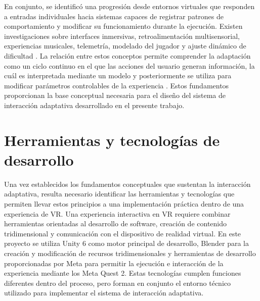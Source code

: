 En conjunto, se identificó una progresión desde entornos virtuales que 
responden a entradas individuales hacia sistemas capaces de registrar 
patrones de comportamiento y modificar su funcionamiento durante la 
ejecución. Existen investigaciones sobre interfaces inmersivas, 
retroalimentación multisensorial, experiencias musicales, telemetría, 
modelado del jugador y ajuste dinámico de dificultad \cite{chen2024interfaces,spittle2023interaction,yeo2024interfaces,pichlmair2007sound,rashed2025engagement,lopes2025closing,zohaib2018dda,huber2021dda,wang2025presence,bareisyte2024questionnaires,sepich2022workload,gibbs2022feedback,yannakakis2009adaptation,zook2012temporal,xue2017dda}.
La relación entre estos conceptos permite comprender la adaptación como 
un ciclo continuo en el que las acciones del usuario generan información, 
la cuál es interpretada mediante un modelo y posteriormente se utiliza 
para modificar parámetros controlables de la experiencia \cite{lopes2025closing,rashed2025engagement,zohaib2018dda}.
Estos fundamentos proporcionan la base conceptual necesaria para el 
diseño del sistema de interacción adaptativa desarrollado en el 
presente trabajo.

\section{Herramientas y tecnologías de desarrollo}
Una vez establecidos los fundamentos conceptuales que sustentan la 
interacción adaptativa, resulta necesario identificar las herramientas 
y tecnologías que permiten llevar estos principios a una implementación 
práctica dentro de una experiencia de VR. Una experiencia interactiva en 
VR requiere combinar herramientas orientadas al desarrollo de software,
creación de contenido tridimensional y comunicación con el dispositivo 
de realidad virtual. En este proyecto se utiliza Unity 6 como motor 
principal de desarrollo, Blender para la creación y modificación de 
recursos tridimensionales y herramientas de desarrollo proporcionadas 
por Meta para permitir la ejecución e interacción de la experiencia 
mediante los Meta Quest 2. Estas tecnologías cumplen funciones 
diferentes dentro del proceso, pero forman en conjunto el entorno 
técnico utilizado para implementar el sistema de interacción 
adaptativa.

